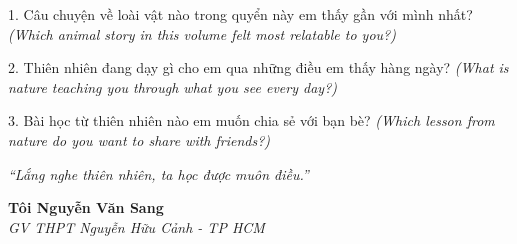 \begin{tcolorbox}[
  colback=truyengold!10, colframe=truyengold!70!black,
  coltitle=black, fonttitle=\bfseries,
  title={T\textit{ự} H\textit{ọ}c Nhanh},
  arc=4pt, boxrule=1pt, breakable, enhanced
]
1. Câu chuyện về loài vật nào trong quyển này em thấy gần với mình nhất? \textit{(Which animal story in this volume felt most relatable to you?)}

2. Thiên nhiên đang dạy gì cho em qua những điều em thấy hàng ngày? \textit{(What is nature teaching you through what you see every day?)}

3. Bài học từ thiên nhiên nào em muốn chia sẻ với bạn bè? \textit{(Which lesson from nature do you want to share with friends?)}
\end{tcolorbox}

\begin{center}
\textit{\color{truyengold}``Lắng nghe thiên nhiên, ta học được muôn điều.''}
\end{center}

\begin{flushright}
\textbf{Tôi Nguyễn Văn Sang}\\
\textit{GV THPT Nguyễn Hữu Cảnh - TP HCM}
\end{flushright}

\ngancach
